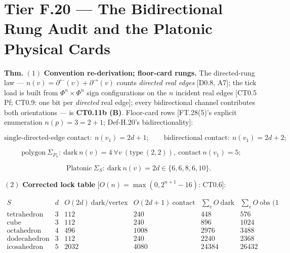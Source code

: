 \section[Tier F.20 — The Bidirectional Rung Audit and the Platonic…]{\texorpdfstring{Tier F.20 — The Bidirectional Rung Audit and the Platonic Physical Cards}{Tier F.20 - The Bidirectional Rung Audit and the Platonic Physical Cards}}

\begin{theorem}\label{tag:FT-62}
\textbf{Thm.} $(1)$ \textbf{Convention re-derivation; floor-card rungs.} The directed-rung law — $n(v)=\partial^{\leftarrow}(v)+\partial^{\rightarrow}(v)$ counts \textit{directed real edges} [D0.8, A7]; the tick load is built from $\Phi^n\times\Phi^n$ sign configurations on the $n$ incident real edges [CT0.5 Pf; CT0.9: one bit per \textit{directed} real edge]; every bidirectional channel contributes both orientations — is \textbf{CT0.11b (B)}. Floor-card rows [FT.28(5)'s explicit enumeration $n(p)=3=2{+}1$; Def-H.20's bidirectionality]:

\[
\text{single-directed-edge contact}:\ n(v_1)=2d+1;\qquad\text{bidirectional contact}:\ n(v_1)=2d+2;
\]

\[
\text{polygon}\ \Sigma_{P_n}:\ \text{dark}\ n(v)=4\ \forall v\ (\text{type}\ (2,2)),\ \text{contact}\ n(v_1)=5;
\]

\[
\qquad \text{Platonic}\ \Sigma_S:\ \text{dark}\ n(v)=2d\in\{6,6,8,6,10\}.
\]

$(2)$ \textbf{Corrected lock table} [$O(n)=\max(0,2^{n+1}-16)$: CT0.6]:

\[
\begin{array}{c|c|c|c|c|c}
S & d & O(2d)\ \text{dark/vertex} & O(2d{+}1)\ \text{contact} & \sum_vO\ \text{dark} & \sum_vO\ \text{obs (1 edge)}\\ \hline
\text{tetrahedron} & 3 & 112 & 240 & 448 & 576\\
\text{cube} & 3 & 112 & 240 & 896 & 1024\\
\text{octahedron} & 4 & 496 & 1008 & 2976 & 3488\\
\text{dodecahedron} & 3 & 112 & 240 & 2240 & 2368\\
\text{icosahedron} & 5 & 2032 & 4080 & 24384 & 26432
\end{array}
\]


\end{theorem}
